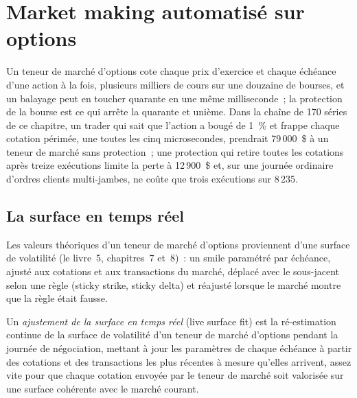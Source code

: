 \chapter{Market making automatisé sur options}\label{ch:hf:automated-options-market-making}

Un teneur de marché d'options cote chaque prix d'exercice et chaque échéance d'une action à la fois, plusieurs milliers de cours sur une douzaine de bourses, et un balayage peut en toucher quarante en une même milliseconde~; la protection de la bourse est ce qui arrête la quarante et unième.
Dans la chaîne de 170 séries de ce chapitre, un trader qui
sait que l'action a bougé de 1~\% et frappe chaque cotation périmée, une toutes les cinq microsecondes, prendrait 79\,000~\$ à un teneur de marché sans protection~;
une protection qui retire toutes les cotations après treize exécutions limite la perte à 12\,900~\$ et, sur une journée ordinaire d'ordres clients multi-jambes, ne coûte
que trois exécutions sur 8\,235.

\section{La surface en temps réel}

Les valeurs théoriques d'un teneur de marché d'options proviennent d'une surface de volatilité (le livre~5, chapitres~7 et~8)~: un smile paramétré par
échéance, ajusté aux cotations et aux transactions du marché, déplacé avec le sous-jacent selon une règle (sticky strike, sticky delta) et réajusté lorsque
le marché montre que la règle était fausse.

\begin{definition}\label{def:hf:automated-options-market-making:live}
Un \emph{ajustement de la surface en temps réel} (live surface fit) est la ré-estimation continue de la surface de volatilité d'un teneur de marché d'options pendant la
journée de négociation, mettant à jour les paramètres de chaque échéance à partir des cotations et des transactions les plus récentes à mesure qu'elles arrivent, assez vite pour que chaque cotation
envoyée par le teneur de marché soit valorisée sur une surface cohérente avec le marché courant.
\end{definition}

